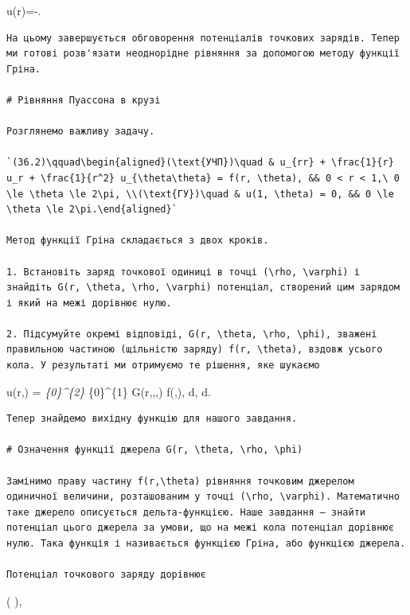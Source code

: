 \documentclass[
  ukrainian,
]{article}
\begin{document}
u\left(r\right)=-\ln{}.

\begin{verbatim}
На цьому завершується обговорення потенціалів точкових зарядів. Тепер ми готові розв'язати неоднорідне рівняння за допомогою методу функції Гріна.

# Рівняння Пуассона в крузі

Розглянемо важливу задачу.

`(36.2)\qquad\begin{aligned}(\text{УЧП})\quad & u_{rr} + \frac{1}{r} u_r + \frac{1}{r^2} u_{\theta\theta} = f(r, \theta), && 0 < r < 1,\ 0 \le \theta \le 2\pi, \\(\text{ГУ})\quad & u(1, \theta) = 0, && 0 \le \theta \le 2\pi.\end{aligned}`

Метод функції Гріна складається з двох кроків.

1. Встановіть заряд точкової одиниці в точці (\rho, \varphi) і знайдіть G(r, \theta, \rho, \varphi) потенціал, створений цим зарядом і який на межі дорівнює нулю.

2. Підсумуйте окремі відповіді, G(r, \theta, \rho, \phi), зважені правильною частиною (щільністю заряду) f(r, \theta), вздовж усього кола. У результаті ми отримуємо те рішення, яке шукаємо
\end{verbatim}

u\left(r,\theta\right) = \int\emph{\{0\}\^{}\{2\pi\} \int}\{0\}\^{}\{1\}
G\left(r,\theta,\rho,\varphi\right) f\left(\rho,\varphi\right)\rho,
d\rho, d\varphi.

\begin{verbatim}
Тепер знайдемо вихідну функцію для нашого завдання.

# Означення функції джерела G(r, \theta, \rho, \phi)

Замінимо праву частину f(r,\theta) рівняння точковим джерелом одиничної величини, розташованим у точці (\rho, \varphi). Математично таке джерело описується дельта-функцією. Наше завдання — знайти потенціал цього джерела за умови, що на межі кола потенціал дорівнює нулю. Така функція і називається функцією Гріна, або функцією джерела.

Потенціал точкового заряду дорівнює
\end{verbatim}

 \ln \left(  \right),
\end{document}
